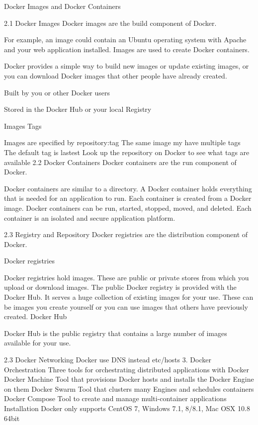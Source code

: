 Docker Images and Docker Containers



2.1 Docker Images
Docker images are the build component of Docker.

For example, an image could contain an Ubuntu operating system with Apache and your web application installed. Images are used to create Docker containers.

Docker provides a simple way to build new images or update existing images, or you can download Docker images that other people have already created.

Built by you or other Docker users

Stored in the Docker Hub or your local Registry

Images Tags

Images are specified by repository:tag
The same image my have multiple tags
The default tag is lastest
Look up the repository on Docker to see what tags are available
2.2 Docker Containers
Docker containers are the run component of Docker.

Docker containers are similar to a directory. A Docker container holds everything that is needed for an application to run. Each container is created from a Docker image. Docker containers can be run, started, stopped, moved, and deleted. Each container is an isolated and secure application platform.

2.3 Registry and Repository
Docker registries are the distribution component of Docker.

Docker registries

Docker registries hold images. These are public or private stores from which you upload or download images. The public Docker registry is provided with the Docker Hub. It serves a huge collection of existing images for your use. These can be images you create yourself or you can use images that others have previously created. Docker Hub

Docker Hub is the public registry that contains a large number of images available for your use.

2.3 Docker Networking
Docker use DNS instead etc/hosts
3. Docker Orchestration
Three tools for orchestrating distributed applications with Docker
Docker Machine
Tool that provisions Docker hosts and installs the Docker Engine on them
Docker Swarm
Tool that clusters many Engines and schedules containers
Docker Compose
Tool to create and manage multi-container applications
Installation
Docker only supports CentOS 7,  Windows 7.1, 8/8.1, Mac OSX 10.8 64bit

